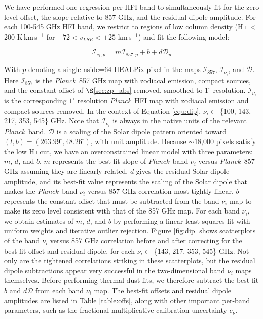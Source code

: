 \documentclass{emulateapj}
\newcommand{\PLANCK}{{\it Planck}}
\begin{document}
We have performed one regression per HFI band to simultaneously fit for the 
zero level offset, the slope relative to 857 GHz, and the residual dipole 
amplitude. For each 100-545 GHz HFI band, we restrict to regions of low column 
density (H\,\textsc{i} $<$ 200 K\,km\,s$^{-1}$ for $-72$$<$$v_{LSR}$$<$$+25$ 
km\,s$^{-1}$) and fit the following model:

\begin{equation} \label{equ:dip}
\mathcal{I}_{\nu_i, p} = m\mathcal{I}_{857, p} + b + d\mathcal{D}_{p}
\end{equation}

With $p$ denoting a single nside=64 HEALPix pixel \citep{healpix} in the maps 
$\mathcal{I}_{857}$, $\mathcal{I}_{\nu_i}$, and $\mathcal{D}$. Here 
$\mathcal{I}_{857}$ is the \PLANCK~857 GHz map with zodiacal emission, compact 
sources, and the constant offset of $\S$\ref{sec:zp_abs} removed, smoothed to 
$1^{\circ}$ resolution. $\mathcal{I}_{\nu_i}$ is the corresponding $1^{\circ}$ 
resolution \PLANCK~HFI map with zodiacal emission and compact sources removed. 
In the context of Equation \ref{equ:dip}, $\nu_i \in$  
\{100, 143, 217, 353, 545\} GHz. Note that $\mathcal{I}_{\nu_i}$ is always in
the native units of the relevant \PLANCK~band. $\mathcal{D}$ is a scaling of 
the Solar dipole pattern oriented toward 
$(l, b) = (263.99^{\circ}, 48.26^{\circ})$, with unit amplitude. Because 
$\sim$18,000 pixels satisfy the low H\,\textsc{i} cut, we have an 
overconstrained linear model with three parameters: $m$, $d$, and $b$. $m$ 
represents the best-fit slope of \PLANCK~band $\nu_i$ versus \PLANCK~857 GHz 
assuming they are linearly related. $d$ gives the residual Solar dipole
amplitude, and its best-fit value represents the scaling of the Solar dipole 
that makes the \PLANCK~band $\nu_i$ versus 857 GHz correlation most tightly 
linear. $b$ represents the constant offset that must be subtracted from the 
band $\nu_i$ map to make its zero level consistent with that of the 857 GHz 
map. For each band $\nu_i$, we obtain estimates of $m$, $d$, and $b$ by 
performing a linear least squares fit with uniform weights and iterative 
outlier rejection. Figure \ref{fig:dip} shows scatterplots of the band $\nu_i$ 
versus 857 GHz correlation before and after correcting for the best-fit offset 
and residual dipole, for each $\nu_i \in$ \{143, 217, 353, 545\} GHz. Not only 
are the tightened correlations striking in these scatterplots, but the residual
dipole subtractions appear very successful in the two-dimensional band $\nu_i$ 
maps themselves. Before performing thermal dust fits, we therefore subtract the
best-fit $b$ and $d\mathcal{D}$ from each band $\nu_i$ map. The best-fit
offsets and residual dipole amplitudes are listed in Table \ref{table:offs},
along with other important per-band parameters, such as the fractional 
multiplicative calibration uncertainty $c_{\nu}$.
\end{document}
